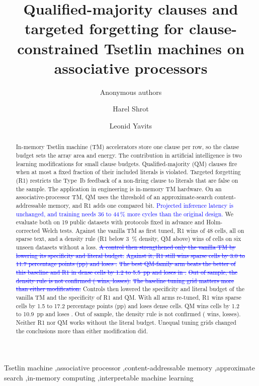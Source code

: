 \documentclass[preprint,12pt,times]{elsarticle}
\newcommand{\proj}[1]{\textcolor{blue}{#1}}
\newcommand{\add}[1]{{\color{blue}#1}}
\newcommand{\del}[1]{\textcolor{blue}{\sout{#1}}}
\begin{document}
\begin{frontmatter}
\title{Qualified-majority clauses and targeted forgetting for clause-constrained Tsetlin machines on associative processors}

\ifdefined\anonymous
\author{Anonymous authors}
\else
\author[biu]{Harel Shrot}
\author[biu]{Leonid Yavits}
\fi

\begin{abstract}
In-memory Tsetlin machine (TM) accelerators store one clause per row, so the clause budget sets the array area and energy.
The contribution in artificial intelligence is two learning modifications for small clause budgets.
Qualified-majority (QM) clauses fire when at most a fixed fraction of their included literals is violated.
Targeted forgetting (R1) restricts the Type~Ib feedback of a non-firing clause to literals that are false on the sample.
The application in engineering is in-memory TM hardware.
On an associative-processor TM, QM uses the threshold of an approximate-search content-addressable memory, and R1 adds one compared bit.
\proj{Projected inference latency is unchanged, and training needs 36 to 44\,\% more cycles than the original design.}
We evaluate both on 19 public datasets with protocols fixed in advance and Holm-corrected Welch tests.
Against the vanilla TM as first tuned, R1 wins \numRwin{} of 48 cells, all on sparse text, and a density rule (R1 below \SI{3}{\percent} density, QM above) wins \numruleWin{} of \numruleN{} cells on six unseen datasets without a loss.
\del{A control then strengthened only the vanilla TM by lowering its specificity and literal budget.}
\del{Against it, R1 still wins \ctlRextsparseW{} sparse cells by 3.0 to 11.7 percentage points (pp) and loses \ctlRextsparseL{}.}
\del{The best QM-family arm beats the better of this baseline and R1 in \ctlBextdenseW{} dense cells by 1.2 to 5.5~pp and loses in \ctlBextdenseL{}.}
\del{Out of sample, the density rule is not confirmed (\ctlruleextallW{} wins, \ctlruleextallL{} losses).}
\del{The baseline tuning grid matters more than either modification.}
\add{Controls then lowered the specificity and literal budget of the vanilla TM and the specificity of R1 and QM.
With all arms re-tuned, R1 wins \ctlRbothsparseW{} sparse cells by 1.5 to 17.2 percentage points (pp) and loses \ctlRbothdenseL{} dense cells.
QM wins \ctlQbothallW{} cells by 1.2 to 10.9~pp and loses \ctlQbothallL{}.
Out of sample, the density rule is not confirmed (\ctlrulebothallW{} wins, \ctlrulebothallL{} losses).
Neither R1 nor QM works without the literal budget.
Unequal tuning grids changed the conclusions more than either modification did.}
\end{abstract}

\begin{keyword}
Tsetlin machine \sep associative processor \sep content-addressable memory \sep approximate search \sep in-memory computing \sep interpretable machine learning
\end{keyword}
\end{frontmatter}
\end{document}
